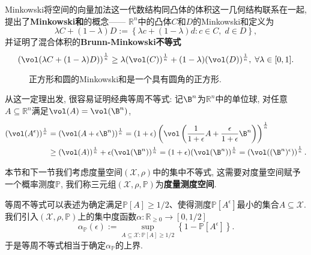 Minkowski将空间的向量加法这一代数结构同凸体的体积这一几何结构联系在一起, 提出了\textbf{Minkowski和}的概念——
$\mathbb{R}^n$中的凸体$C$和$D$的Minkowski和定义为
\begin{equation*}
	\lambda C + (1 - \lambda) D := \left\{ \lambda c + (1 - \lambda) d \colon c \in C,\; d \in D \right\}, 
\end{equation*}
并证明了混合体积的\textbf{Brunn-Minkowski不等式}
\begin{equation*}
	\left( \vol(\lambda C + (1-\lambda) D)  \right)^{\frac1n}
	\geq \lambda (\vol(C))^{\frac1n} + (1-\lambda) (\vol(D))^{\frac1n},\;
	\forall \lambda \in [0,1]. 
\end{equation*}
\begin{figure}[H]
	\centering
	\caption{正方形和圆的Minkowski和是一个具有圆角的正方形.}
\end{figure}
\noindent
从这一定理出发, 很容易证明经典等周不等式: 记$\B^n$为$\mathbb{R}^n$中的单位球, 对任意$A \subseteq \mathbb{R}^n$满足$\vol(A) = \vol(\B^n)$, 
\begin{align*}
	(\vol(A^{\epsilon}))^{\frac1n}
	&= (\vol(A + \epsilon \B^n))^{\frac1n}
	= (1+\epsilon) \left(\vol\left(\frac{1}{1+\epsilon} A + \frac{\epsilon}{1+\epsilon} \B^n\right)\right)^{\frac1n} \\
	&\geq (\vol(A))^{\frac1n} + \epsilon (\vol(\B^n))^{\frac1n} 
	= (1+\epsilon) (\vol(\B^n))^{\frac1n} 
	= \left( \vol((\B^n)^{\epsilon}) \right)^{\frac1n}. 
\end{align*}

本节和下一节我们考虑度量空间$(\mathcal{X}, \rho)$中的集中不等式, 这需要对度量空间赋予一个概率测度$\mathbb{P}$, 我们称三元组$(\mathcal{X}, \rho, \mathbb{P})$为\textbf{度量测度空间}. 

等周不等式可以表述为确定满足$\mathbb{P}[A] \geq 1/2$、使得测度$\mathbb{P}[A^{\epsilon}]$最小的集合$A \subseteq \mathcal{X}$.
我们引入$(\mathcal{X}, \rho, \mathbb{P})$上的集中度函数$\alpha \colon \mathbb{R}_{\geq 0} \to [0, 1/2]$
\begin{equation*}
	\alpha_{\mathbb{P}}(\epsilon)
	:= \sup_{A \subseteq \mathcal{X} \colon \mathbb{P}[A] \geq 1/2} \left\{ 1 - \mathbb{P}[A^{\epsilon}] \right\}. 
\end{equation*}
于是等周不等式相当于确定$\alpha_{\mathbb{P}}$的上界. 

